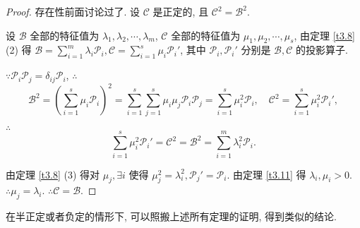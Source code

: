\documentclass{ctexart}
\begin{document}
\begin{proof}
    存在性前面讨论过了. 设 $\mathcal{C}$ 是正定的, 且 $\mathcal{C}^2=\mathcal{B}^2$.

    设 $\mathcal{B}$ 全部的特征值为 $\lambda_1,\lambda_2,\cdots,\lambda_m$, $\mathcal{C}$ 全部的特征值为 $\mu_1,\mu_2,\cdots,\mu_s$, 由定理 \ref{t3.8} (2) 得 $\mathcal{B}=\sum\limits_{i=1}^m\lambda_i\mathcal{P}_i,\mathcal{C}=\sum\limits_{i=1}^s\mu_i\mathcal{P}_i'$, 其中 $\mathcal{P}_i,\mathcal{P}_i'$ 分别是 $\mathcal{B},\mathcal{C}$ 的投影算子.

    $\because\mathcal{P}_i\mathcal{P}_j=\delta_{ij}\mathcal{P}_i$, $\therefore$
    \[\mathcal{B}^2=\left(\sum\limits_{i=1}^s\mu_i\mathcal{P}_i\right)^2=\sum\limits_{i=1}^s\sum\limits_{j=1}^s\mu_i\mu_j\mathcal{P}_i\mathcal{P}_j=\sum\limits_{i=1}^s\mu_i^2\mathcal{P}_i,\quad\mathcal{C}^2=\sum\limits_{i=1}^s\mu_i^2\mathcal{P}_i',\]

    $\therefore$
    \[\sum\limits_{i=1}^s\mu_i^2\mathcal{P}_i'=\mathcal{C}^2=\mathcal{B}^2=\sum\limits_{i=1}^m\lambda_i^2\mathcal{P}_i.\]

    由定理 \ref{t3.8} (3) 得对 $\mu_j,\exists i$ 使得 $\mu_j^2=\lambda_i^2,\mathcal{P}_j'=\mathcal{P}_i$. 由定理 \ref{t3.11} 得 $\lambda_i,\mu_i>0$. $\therefore\mu_j=\lambda_i$. $\therefore\mathcal{C}=\mathcal{B}$.
\end{proof}
在半正定或者负定的情形下, 可以照搬上述所有定理的证明, 得到类似的结论.
\end{document}
